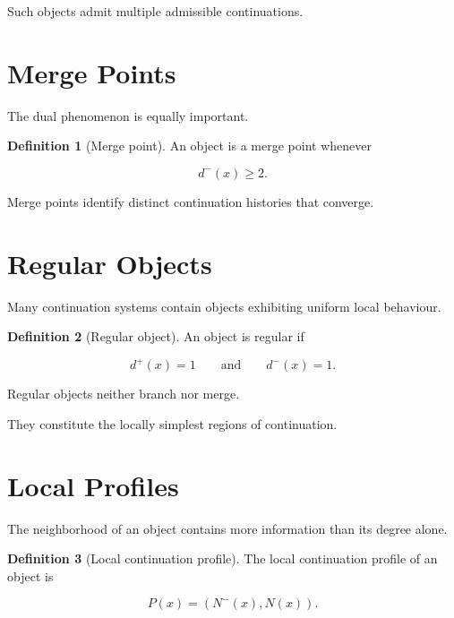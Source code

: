 \documentclass[13pt,openany]{book}
\theoremstyle{plain}
\theoremstyle{definition}
\newtheorem{definition}{Definition}[chapter]
\begin{document}
Such objects admit multiple admissible continuations.


\section{Merge Points}

The dual phenomenon is equally important.

\begin{definition}[Merge point]

An object is a merge point whenever

\[
d^{-}(x)\ge2.
\]

\end{definition}

Merge points identify distinct continuation histories that converge.


\section{Regular Objects}

Many continuation systems contain objects exhibiting uniform local behaviour.

\begin{definition}[Regular object]

An object is regular if

\[
d^{+}(x)=1
\qquad\text{and}\qquad
d^{-}(x)=1.
\]

\end{definition}

Regular objects neither branch nor merge.

They constitute the locally simplest regions of continuation.


\section{Local Profiles}

The neighborhood of an object contains more information than its degree alone.

\begin{definition}[Local continuation profile]

The local continuation profile of an object is

\[
P(x)
=
\left(
N^{-}(x),
N(x)
\right).
\]

\end{definition}
\end{document}
